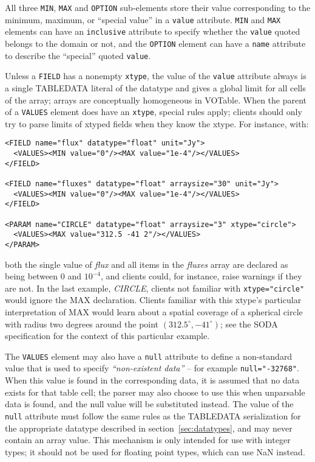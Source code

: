 \documentclass[11pt,a4paper]{ivoa}
\def\Aref#1{section~\ref{#1}}
\let\fg=\color
\def\attr#1{{\tt{\fg{DarkRed}#1}}}
\def\elem#1{{\tt{\fg{DarkRed}#1}}}
\def\attrval#1#2{{\tt{\fg{DarkRed}#1}="{\fg{DarkPurple}#2}"}}
\begin{document}
All three \elem{MIN}, \elem{MAX} and \elem{OPTION} sub-elements
store their value corresponding to the minimum, maximum, or ``special value''
in a \attr{value} attribute. \elem{MIN} and \elem{MAX} elements
can have an \attr{inclusive} attribute to specify whether the \attr{value}
quoted belongs to the domain or not, and the  \elem{OPTION} element
can have a \attr{name} attribute to describe the ``special'' quoted
\attr{value}.

Unless a \elem{FIELD} has a nonempty \attr{xtype}, the value of the
\attr{value} attribute always is a single TABLEDATA literal of
the datatype and gives a global limit for all cells of the array; arrays
are conceptually homogeneous in VOTable.  When the parent of a
\elem{VALUES} element does have an \attr{xtype}, special rules apply;
clients should only try to parse limits of xtyped fields when they know
the xtype.  For instance, with:

\begin{verbatim}
<FIELD name="flux" datatype="float" unit="Jy">
  <VALUES><MIN value="0"/><MAX value="1e-4"/></VALUES>
</FIELD>

<FIELD name="fluxes" datatype="float" arraysize="30" unit="Jy">
  <VALUES><MIN value="0"/><MAX value="1e-4"/></VALUES>
</FIELD>

<PARAM name="CIRCLE" datatype="float" arraysize="3" xtype="circle">
  <VALUES><MAX value="312.5 -41 2"/></VALUES>
</PARAM>
\end{verbatim}

\noindent both the single value of \emph{flux} and all items in the \emph{fluxes}
array are declared as being between 0 and $10^{-4}$, and clients could,
for instance, raise warnings if they are not.  In the last example,
\emph{CIRCLE}, clients not familiar with \attrval{xtype}{circle} would
ignore the MAX declaration.  Clients familiar with this xtype's
particular interpretation of MAX would learn about a spatial coverage of
a spherical circle with radius two degrees around the point
$(312.5^\circ,-41^\circ)$; see the SODA specification
\citep{2017ivoa.spec.0517B} for the context of this particular example.

The \elem{VALUES} element may also have a \attr{null} attribute
to define a non-standard value that is used to specify
{\em``non-existent data''} -- for example \attrval{null}{-32768}.
When this value is found in the corresponding data, it is assumed that no data
exists for that table cell; the parser may also choose to use this
when unparsable data is found, and the null value will be substituted
instead.
The value of the \attr{null} attribute must follow the same rules
as the TABLEDATA serialization for the appropriate datatype
described in \Aref{sec:datatypes},
and may never contain an array value.
This mechanism is only intended for use with integer types;
it should not be used for floating point types, which can use NaN instead.
\end{document}
